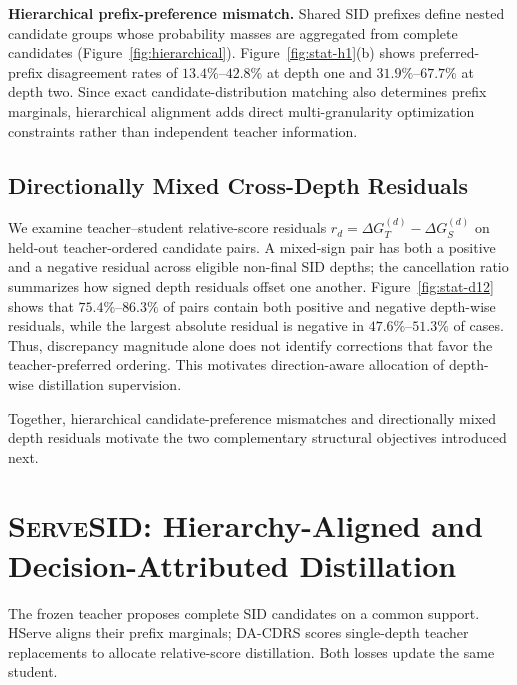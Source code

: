 \documentclass[sigconf, anonymous, review]{acmart}
\newcommand{\method}{\textsc{ServeSID}}
\begin{document}
\textbf{Hierarchical prefix-preference mismatch.} Shared SID prefixes define nested candidate groups whose probability masses are aggregated from complete candidates (Figure~\ref{fig:hierarchical}). Figure~\ref{fig:stat-h1}(b) shows preferred-prefix disagreement rates of $13.4\%$--$42.8\%$ at depth one and $31.9\%$--$67.7\%$ at depth two. Since exact candidate-distribution matching also determines prefix marginals, hierarchical alignment adds direct multi-granularity optimization constraints rather than independent teacher information.





\subsection{Directionally Mixed Cross-Depth Residuals}
\label{sec:diag-d2}

We examine teacher--student relative-score residuals
$r_d=\Delta G_T^{(d)}-\Delta G_S^{(d)}$ on held-out teacher-ordered
candidate pairs. A mixed-sign pair has both a positive and a negative
residual across eligible non-final SID depths; the cancellation ratio
summarizes how signed depth residuals offset one another. Figure~\ref{fig:stat-d12} shows that $75.4\%$--$86.3\%$ of pairs contain both positive and negative depth-wise residuals, while the largest absolute residual is negative in $47.6\%$--$51.3\%$ of cases. Thus, discrepancy magnitude alone does not identify corrections that favor the teacher-preferred ordering. This motivates direction-aware allocation of depth-wise distillation supervision.

Together, hierarchical candidate-preference mismatches and directionally mixed depth residuals motivate the two complementary structural objectives introduced next.







\section{\method: Hierarchy-Aligned and Decision-Attributed Distillation}
\label{sec:method}

The frozen teacher proposes complete SID candidates on a common
support. HServe aligns their prefix marginals; DA-CDRS scores
single-depth teacher replacements to allocate relative-score
distillation. Both losses update the same student.
\end{document}
